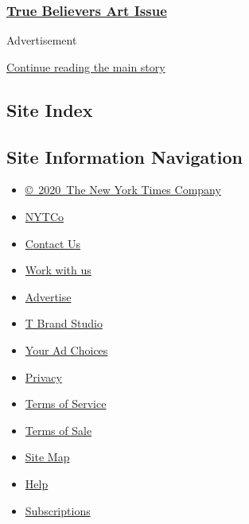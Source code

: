 \hypertarget{true-believers-art-issue}{%
\subsubsection{\texorpdfstring{\href{https://www.nytimes3xbfgragh.onion/issue/t-magazine/2020/07/02/true-believers-art-issue}{True
Believers Art
Issue}}{True Believers Art Issue}}\label{true-believers-art-issue}}

Advertisement

\protect\hyperlink{after-bottom}{Continue reading the main story}

\hypertarget{site-index}{%
\subsection{Site Index}\label{site-index}}

\hypertarget{site-information-navigation}{%
\subsection{Site Information
Navigation}\label{site-information-navigation}}

\begin{itemize}
\tightlist
\item
  \href{https://help.nytimes3xbfgragh.onion/hc/en-us/articles/115014792127-Copyright-notice}{©~2020~The
  New York Times Company}
\end{itemize}

\begin{itemize}
\tightlist
\item
  \href{https://www.nytco.com/}{NYTCo}
\item
  \href{https://help.nytimes3xbfgragh.onion/hc/en-us/articles/115015385887-Contact-Us}{Contact
  Us}
\item
  \href{https://www.nytco.com/careers/}{Work with us}
\item
  \href{https://nytmediakit.com/}{Advertise}
\item
  \href{http://www.tbrandstudio.com/}{T Brand Studio}
\item
  \href{https://www.nytimes3xbfgragh.onion/privacy/cookie-policy\#how-do-i-manage-trackers}{Your
  Ad Choices}
\item
  \href{https://www.nytimes3xbfgragh.onion/privacy}{Privacy}
\item
  \href{https://help.nytimes3xbfgragh.onion/hc/en-us/articles/115014893428-Terms-of-service}{Terms
  of Service}
\item
  \href{https://help.nytimes3xbfgragh.onion/hc/en-us/articles/115014893968-Terms-of-sale}{Terms
  of Sale}
\item
  \href{https://spiderbites.nytimes3xbfgragh.onion}{Site Map}
\item
  \href{https://help.nytimes3xbfgragh.onion/hc/en-us}{Help}
\item
  \href{https://www.nytimes3xbfgragh.onion/subscription?campaignId=37WXW}{Subscriptions}
\end{itemize}
